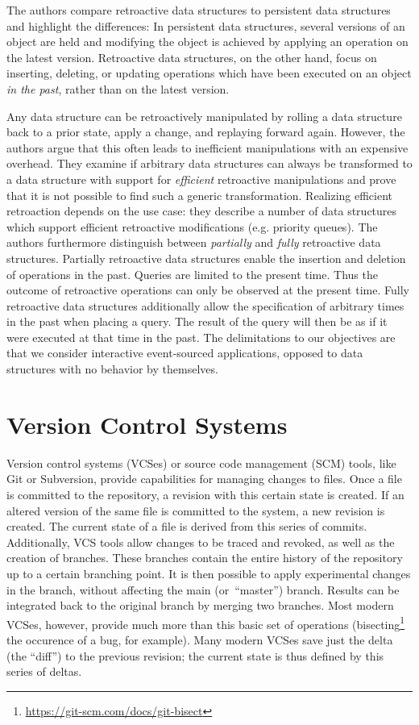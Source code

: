 The authors compare retroactive data structures to persistent data structures
and highlight the differences: In persistent data structures, several versions 
of an object are held and modifying the object is achieved by applying an 
operation on the latest version.
Retroactive data structures, on the other hand, focus on inserting, deleting, 
or updating operations which have been executed on an object \emph{in the past}, 
rather than on the latest version.

Any data structure can be retroactively manipulated by rolling a data structure 
back to a prior state, apply a change, and replaying forward again. However,
the authors argue that this often leads to inefficient manipulations with 
an expensive overhead.
They examine if arbitrary data structures can always be transformed to a 
data structure with support for \emph{efficient} retroactive manipulations
and prove that it is not possible to find such a generic transformation.
Realizing efficient retroaction depends on the use case: they describe a 
number of data structures which support efficient retroactive modifications 
(e.g. priority queues).
%
The authors furthermore distinguish between \emph{partially} and \emph{fully} 
retroactive data structures. Partially retroactive data structures enable the 
insertion and deletion of operations in the past. Queries are limited to the 
present time. 
Thus the outcome of retroactive operations can only be observed at the present 
time. Fully retroactive data structures additionally allow the specification of 
arbitrary times in the past when placing a query. The result of the query will 
then be as if it were executed at that time in the past.
The delimitations to our objectives are that we consider interactive event-sourced
applications, opposed to data structures with no behavior by themselves. 


\section{Version Control Systems}
Version control systems (VCSes) or source code management (SCM) tools, like Git 
or Subversion, provide capabilities for managing changes to files. Once a file 
is committed to the repository, a revision with this certain state is created.
If an altered version of the same file is committed to the system, a new revision 
is created. The current state of a file is derived from this series of commits. 
Additionally, VCS tools allow changes to be traced and revoked, as well as the 
creation of branches.
These branches contain the entire history of the repository up to a certain 
branching point. It is then possible to apply experimental changes in the branch, 
without affecting the main \mbox{(or ``master'')} branch. Results can be 
integrated back to the original branch by merging two branches.
Most modern VCSes, however, provide much more than this basic set of operations
(bisecting\footnote[1]{\href{https://git-scm.com/docs/git-bisect}{https://git-scm.com/docs/git-bisect}} 
the occurence of a bug, for example).
Many modern \mbox{VCSes} save just the delta (the ``diff'') to the previous 
revision; the current state is thus defined by this series of deltas.

